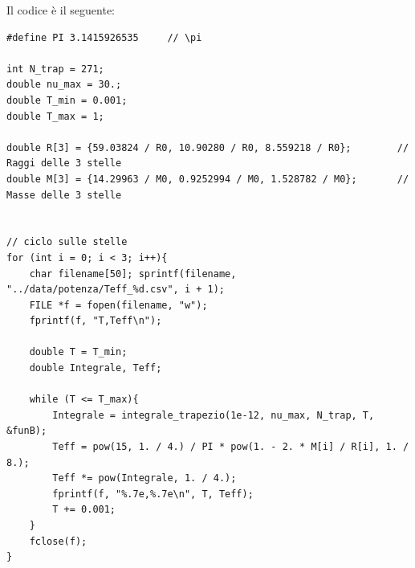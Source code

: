 \documentclass[a4paper, titlepage]{article}
\begin{document}
Il codice è il seguente:

\begin{lstlisting}
#define PI 3.1415926535     // \pi

int N_trap = 271;
double nu_max = 30.;
double T_min = 0.001;
double T_max = 1;

double R[3] = {59.03824 / R0, 10.90280 / R0, 8.559218 / R0};        // Raggi delle 3 stelle
double M[3] = {14.29963 / M0, 0.9252994 / M0, 1.528782 / M0};       // Masse delle 3 stelle


// ciclo sulle stelle
for (int i = 0; i < 3; i++){
    char filename[50]; sprintf(filename, "../data/potenza/Teff_%d.csv", i + 1);
    FILE *f = fopen(filename, "w");
    fprintf(f, "T,Teff\n");

    double T = T_min;
    double Integrale, Teff;

    while (T <= T_max){
        Integrale = integrale_trapezio(1e-12, nu_max, N_trap, T, &funB);
        Teff = pow(15, 1. / 4.) / PI * pow(1. - 2. * M[i] / R[i], 1. / 8.);
        Teff *= pow(Integrale, 1. / 4.);
        fprintf(f, "%.7e,%.7e\n", T, Teff);
        T += 0.001;
    }
    fclose(f);
}
\end{lstlisting}
\end{document}
